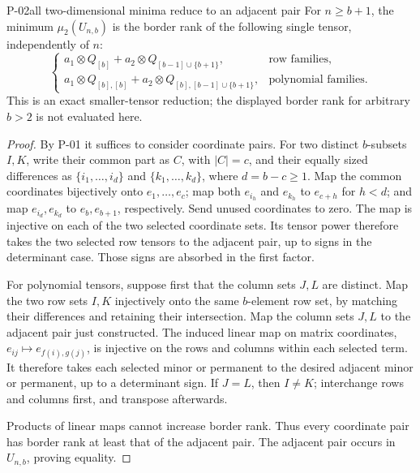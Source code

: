 \begin{finding}{P-02}{all two-dimensional minima reduce to an adjacent pair}
For \(n\geq b+1\), the minimum \(\mu_2(U_{n,b})\) is the border rank
of the following single tensor, independently of \(n\):
\[
 \begin{cases}
 a_1\otimes Q_{[b]}+
 a_2\otimes Q_{[b-1]\cup\{b+1\}},&\text{row families},\\[2mm]
 a_1\otimes Q_{[b],[b]}+
 a_2\otimes Q_{[b],[b-1]\cup\{b+1\}},&\text{polynomial families}.
 \end{cases}
\]
This is an exact smaller-tensor reduction; the displayed border
rank for arbitrary \(b>2\) is not evaluated here.
\end{finding}
\begin{proof}
By P-01 it suffices to consider coordinate pairs.
For two distinct \(b\)-subsets \(I,K\), write their common part as
\(C\), with \(|C|=c\), and their equally sized differences as
\(\{i_1,\ldots,i_d\}\) and \(\{k_1,\ldots,k_d\}\), where
\(d=b-c\geq1\). Map the common coordinates bijectively onto
\(e_1,\ldots,e_c\); map both \(e_{i_h}\) and \(e_{k_h}\) to
\(e_{c+h}\) for \(h<d\); and map \(e_{i_d},e_{k_d}\) to
\(e_b,e_{b+1}\), respectively. Send unused coordinates to zero.
The map is injective on each of the two selected coordinate sets.
Its tensor power therefore takes the two selected row tensors to
the adjacent pair, up to signs in the determinant case. Those
signs are absorbed in the first factor.

For polynomial tensors, suppose first that the column sets \(J,L\)
are distinct. Map the two row sets \(I,K\) injectively onto the
same \(b\)-element row set, by matching their differences and
retaining their intersection. Map the column sets \(J,L\) to the
adjacent pair just constructed. The induced linear map on matrix
coordinates, \(e_{ij}\mapsto e_{f(i),g(j)}\), is injective on the
rows and columns within each selected term. It therefore takes
each selected minor or permanent to the desired adjacent minor
or permanent, up to a determinant sign. If \(J=L\), then
\(I\ne K\); interchange rows and columns first, and transpose
afterwards.

Products of linear maps cannot increase border rank. Thus every
coordinate pair has border rank at least that of the adjacent
pair. The adjacent pair occurs in \(U_{n,b}\), proving equality.
\end{proof}

